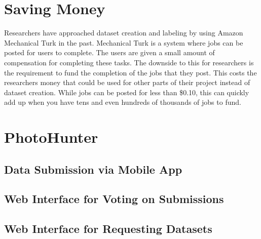 \documentclass{article}
\begin{document}
\section{Saving Money}

Researchers have approached dataset creation and labeling by using 
Amazon Mechanical Turk in the past.  Mechanical Turk is a system where
jobs can be posted for users to complete.  The users are given a small 
amount of compensation for completing these tasks.  The downside to this
for researchers is the requirement to fund the completion of the jobs
that they post.  This costs the researchers money that could be used
for other parts of their project instead of dataset creation.  While jobs
can be posted for less than \$0.10, this can quickly add up when you have
tens and even hundreds of thousands of jobs to fund.

\section{PhotoHunter}

\subsection{Data Submission via Mobile App}

\subsection{Web Interface for Voting on Submissions}

\subsection{Web Interface for Requesting Datasets}
\end{document}
